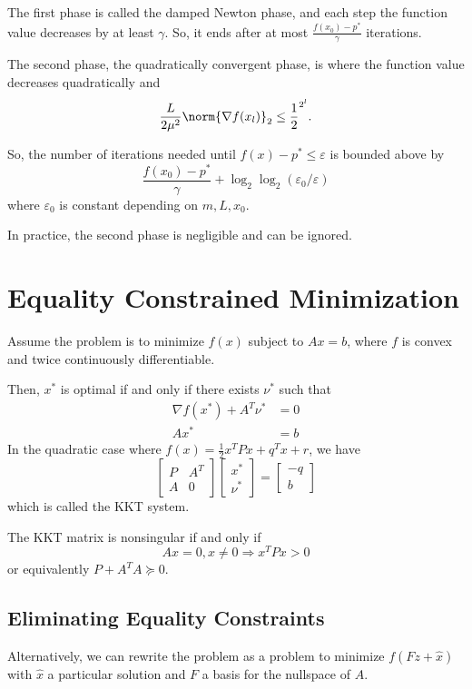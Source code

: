 \documentclass[11pt]{article}
\begin{document}
The first phase is called the damped Newton phase, and each step the function value decreases by at least $\gamma$. So, it ends after at most $\frac{f(x_0) - p^*}{\gamma}$ iterations. \par 
The second phase, the quadratically convergent phase, is where the function value decreases quadratically and 
\[ \frac{L}{2\mu^2} \norm{\nabla f(x_l)}_2 \leq \frac{1}{2}^{2^l}. \] 

So, the number of iterations needed until $f(x) - p^* \leq \varepsilon$ is bounded above by 
\[ \frac{f(x_0) - p^*}{\gamma} + \log_2\log_2 (\varepsilon_0 / \varepsilon) \] 
where $\varepsilon_0$ is constant depending on $m, L, x_0$. \par
In practice, the second phase is negligible and can be ignored.

\newpage 
\section{Equality Constrained Minimization} 
Assume the problem is to minimize $f(x)$ subject to $Ax = b$, where $f$ is convex and twice continuously differentiable. \par
Then, $x^*$ is optimal if and only if there exists $\nu^*$ such that 
\begin{align*}
    \nabla f(x^*) + A^T\nu^* &= 0 \\ 
    Ax^* &= b
\end{align*}
In the quadratic case where $f(x) = \frac{1}{2}x^TPx + q^Tx + r$, we have 
\[ \begin{bmatrix}
    P & A^T \\ A & 0
\end{bmatrix} \begin{bmatrix}
    x^* \\ \nu^*
\end{bmatrix} = \begin{bmatrix}
    -q \\ b
\end{bmatrix} \] 
which is called the KKT system. \par
The KKT matrix is nonsingular if and only if 
\[ Ax = 0, x \neq 0 \Rightarrow x^TPx > 0 \] 
or equivalently $P + A^TA \succeq 0$. 

\subsection{Eliminating Equality Constraints} 
Alternatively, we can rewrite the problem as a problem to minimize $f(Fz + \hat{x})$ with $\hat{x}$ a particular solution and $F$ a basis for the nullspace of $A$. \par
\end{document}
